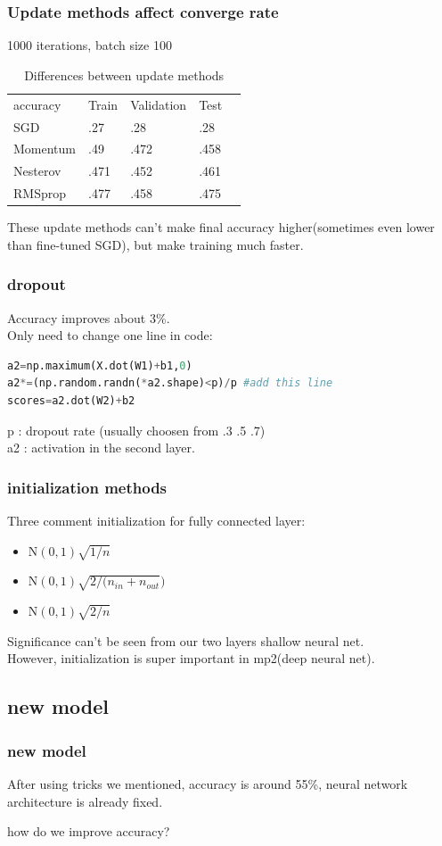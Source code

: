 \documentclass{beamer}
\begin{document}
\begin{frame}
\frametitle{Update methods affect converge rate}
1000 iterations, batch size 100
\begin{table}
\centering
\caption{Differences between update methods}
\begin{tabular}{lllll}
accuracy & Train & Validation & Test &  \\
SGD      & .27   & .28        & .28  &  \\
Momentum & .49   & .472       & .458 &  \\
Nesterov & .471  & .452       & .461 &  \\
RMSprop  & .477  & .458       & .475 & 
\end{tabular}
\end{table}
These update methods can't make final accuracy higher(sometimes even lower than fine-tuned SGD),
 but make training much faster.
\end{frame}
\begin{frame}[fragile]
 \frametitle{dropout}
 Accuracy improves about 3\%. \\
 Only need to change one line in code:
\begin{lstlisting}[language=python]
a2=np.maximum(X.dot(W1)+b1,0)
a2*=(np.random.randn(*a2.shape)<p)/p #add this line
scores=a2.dot(W2)+b2
\end{lstlisting}
p  : dropout rate (usually choosen from .3 .5 .7) \\
a2 : activation in the second layer.
\end{frame}


\begin{frame}
\frametitle{initialization methods}
Three comment initialization for fully connected layer:
\begin{itemize}
\item $\text{N}(0,1)\sqrt{1/n}$
\item $\text{N}(0,1)\sqrt{2/(n_{in} + n _{out}})$ 
\item $\text{N}(0,1)\sqrt{2/n}$
\end{itemize}
Significance can't be seen from our two layers shallow neural net.\\
However, initialization is super important in mp2(deep neural net).
\end{frame}

\subsection{new model}
\begin{frame}
\frametitle{new model}
After using tricks we mentioned, accuracy is around 55\%, 
neural network architecture is already fixed. \\
\phantom{dsf}
\begin{huge}
how do we improve accuracy?
\end{huge}
\end{frame}
\end{document}
